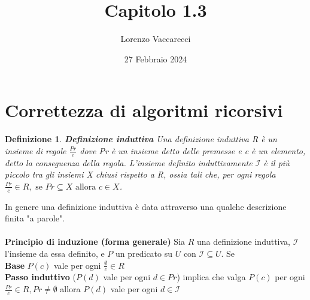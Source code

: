 \documentclass[12pt]{article}
\title{Capitolo 1.3}
\author{Lorenzo Vaccarecci}
\date{27 Febbraio 2024}
\newtheorem{definition}{Definizione}
\begin{document}
\maketitle
\section{Correttezza di algoritmi ricorsivi}
\begin{definition}
    \textbf{Definizione induttiva} Una definizione induttiva R è un insieme di regole \(\frac{Pr}{c}\) dove Pr è un insieme detto delle premesse e c è un elemento, detto la conseguenza della regola. L'insieme definito induttivamente \(\mathcal{I}\) è il più piccolo tra gli insiemi X chiusi rispetto a R, ossia tali che, per ogni regola \(\frac{Pr}{c} \in R, \text{ se } Pr \subseteq X \text{ allora } c \in X\). 
\end{definition}
In genere una definizione induttiva è data attraverso una qualche descrizione finita "a parole".\\
\\\textbf{Principio di induzione (forma generale)} Sia \(R\) una definizione induttiva, \(\mathcal{I}\) l'insieme da essa definito, e \(P\) un predicato su \(U\) con \(\mathcal{I} \subseteq U\). Se\\
\textbf{Base} \(P(c)\) vale per ogni \(\frac{\emptyset}{c} \in R\)\\
\textbf{Passo induttivo} (\(P(d)\) vale per ogni \(d \in Pr\)) implica che valga \(P(c)\) per ogni \(\frac{Pr}{c} \in R, Pr \neq \emptyset\) allora \(P(d)\) vale per ogni \(d \in \mathcal{I}\)
\end{document}
